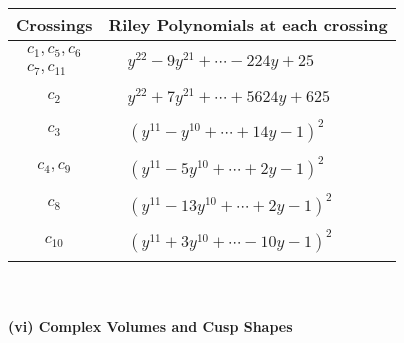 \documentclass[1p]{elsarticle_modified}
\theoremstyle{definition}
\begin{document}
\begin{tabular}{m{50pt}|m{274pt}}
Crossings & \hspace{64pt}Riley Polynomials at each crossing \\
\hline $$\begin{aligned}c_{1},c_{5},c_{6}\\c_{7},c_{11}\end{aligned}$$&$\begin{aligned}
&y^{22}-9 y^{21}+\cdots-224 y+25
\end{aligned}$\\
\hline $$\begin{aligned}c_{2}\end{aligned}$$&$\begin{aligned}
&y^{22}+7 y^{21}+\cdots+5624 y+625
\end{aligned}$\\
\hline $$\begin{aligned}c_{3}\end{aligned}$$&$\begin{aligned}
&(y^{11}- y^{10}+\cdots+14 y-1)^{2}
\end{aligned}$\\
\hline $$\begin{aligned}c_{4},c_{9}\end{aligned}$$&$\begin{aligned}
&(y^{11}-5 y^{10}+\cdots+2 y-1)^{2}
\end{aligned}$\\
\hline $$\begin{aligned}c_{8}\end{aligned}$$&$\begin{aligned}
&(y^{11}-13 y^{10}+\cdots+2 y-1)^{2}
\end{aligned}$\\
\hline $$\begin{aligned}c_{10}\end{aligned}$$&$\begin{aligned}
&(y^{11}+3 y^{10}+\cdots-10 y-1)^{2}
\end{aligned}$\\
\hline
\end{tabular}\\~\\
\newpage\flushleft \textbf{(vi) Complex Volumes and Cusp Shapes}
\end{document}

